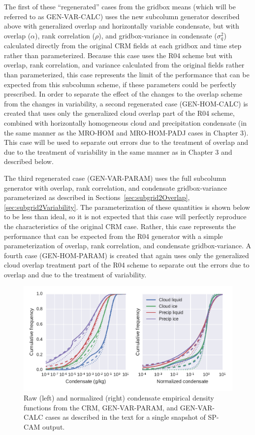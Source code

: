 The first of these ``regenerated'' cases from the gridbox means (which
will be referred to as GEN-VAR-CALC) uses the new subcolumn generator
described above with generalized overlap and horizontally variable
condensate, but with overlap (\(\alpha\)), rank correlation (\(\rho\)),
and gridbox-variance in condensate (\(\sigma_q^2\)) calculated directly
from the original CRM fields at each gridbox and time step rather than
parameterized. Because this case uses the R04 scheme but with overlap,
rank correlation, and variance calculated from the original fields
rather than parameterized, this case represents the limit of the
performance that can be expected from this subcolumn scheme, if these
parameters could be perfectly prescribed. In order to separate the
effect of the changes to the overlap scheme from the changes in
variability, a second regenerated case (GEN-HOM-CALC) is created that
uses only the generalized cloud overlap part of the R04 scheme, combined
with horizontally homogeneous cloud and precipitation condensate (in the
same manner as the MRO-HOM and MRO-HOM-PADJ cases in Chapter 3). This
case will be used to separate out errors due to the treatment of overlap
and due to the treatment of variability in the same manner as in Chapter
3 and described below.

The third regenerated case (GEN-VAR-PARAM) uses the full subcolumn
generator with overlap, rank correlation, and condensate
gridbox-variance parameterized as described in
Sections~\ref{sec:subgrid2Overlap}, \ref{sec:subgrid2Variability}. The
parameterization of these quantities is shown below to be less than
ideal, so it is not expected that this case will perfectly reproduce the
characteristics of the original CRM case. Rather, this case represents
the performance that can be expected from the R04 generator with a
simple parameterization of overlap, rank correlation, and condensate
gridbox-variance. A fourth case (GEN-HOM-PARAM) is created that again
uses only the generalized cloud overlap treatment part of the R04 scheme
to separate out the errors due to overlap and due to the treatment of
variability.

\begin{figure}[htbp]
\centering
\includegraphics{graphics/subgrid2_mxratio_cdf2.pdf}
\caption{\label{fig:mxratioCDF2}Raw (left) and normalized (right)
condensate empirical density functions from the CRM, GEN-VAR-PARAM, and
GEN-VAR-CALC cases as described in the text for a single snapshot of
SP-CAM output.}\label{fig:mxratioCDF2}
\end{figure}


